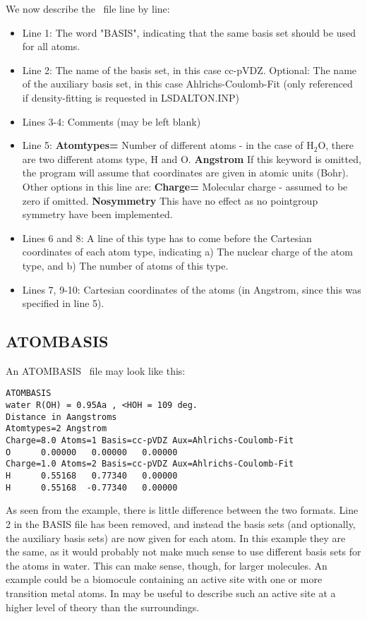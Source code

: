 We now describe the \mol\ file line by line:
\begin{itemize}
\item Line 1: The word "BASIS", indicating that the same basis set should be used for all 
atoms.
\item Line 2: The name of the basis set, in this case cc-pVDZ. Optional: The name
of the auxiliary basis set, in this case Ahlrichs-Coulomb-Fit
(only referenced if density-fitting is requested in LSDALTON.INP)
\item Lines 3-4: Comments (may be left blank)
\item Line 5: {\bf Atomtypes=} Number of different atoms - in the case of H$_2$O, there are two different
atoms type, H and O. {\bf Angstrom} If this keyword is omitted, the program will assume that coordinates
are given in atomic units (Bohr). Other options in this line are:
{\bf Charge=} Molecular charge - assumed to be zero if omitted. 
{\bf Nosymmetry} This have no effect as no pointgroup symmetry have been implemented. 
\item Lines 6 and 8: A line of this type has to come before the Cartesian coordinates of each atom
type, indicating a) The nuclear charge of the atom type, and b) The number of atoms of this type.
\item Lines 7, 9-10: Cartesian coordinates of the atoms (in Angstrom, since this was specified 
in line 5).
\end{itemize}

\subsection{ATOMBASIS}

An ATOMBASIS \mol\ file may look like this:
\begin{verbatim}
ATOMBASIS
water R(OH) = 0.95Aa , <HOH = 109 deg.
Distance in Aangstroms
Atomtypes=2 Angstrom
Charge=8.0 Atoms=1 Basis=cc-pVDZ Aux=Ahlrichs-Coulomb-Fit
O      0.00000   0.00000   0.00000
Charge=1.0 Atoms=2 Basis=cc-pVDZ Aux=Ahlrichs-Coulomb-Fit
H      0.55168   0.77340   0.00000
H      0.55168  -0.77340   0.00000
\end{verbatim}
As seen from the example, there is little difference between the two
formats. Line 2 in the BASIS file has been removed, and instead the basis
sets (and optionally, the auxiliary basis sets) are now given for each
atom. In this example they are the same, as it would probably not make
much sense to use different basis sets for the atoms in water. This can
make sense, though, for larger molecules. An example could be a biomocule containing
an active site with one or more transition metal atoms. In may be useful to
describe such an active site at a higher level of theory than the surroundings. 


